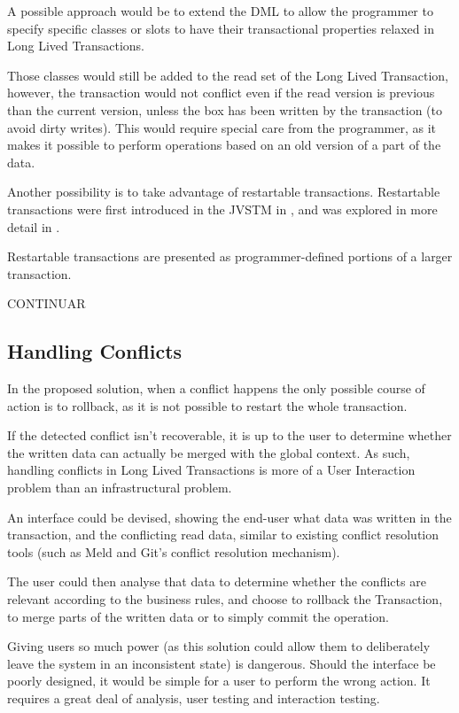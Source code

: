A possible approach would be to extend the DML to allow the programmer
to specify specific classes or slots to have their transactional
properties relaxed in Long Lived Transactions.

Those classes would still be added to the read set of the Long Lived
Transaction, however, the transaction would not conflict even if the
read version is previous than the current version, unless the box has
been written by the transaction (to avoid dirty writes). This would
require special care from the programmer, as it makes it possible to
perform operations based on an old version of a part of the data.

Another possibility is to take advantage of restartable
transactions. Restartable transactions were first introduced in the
JVSTM in \cite{cachopo2006versioned}, and was explored in more detail
in \cite{BrunoJorgeGasparFranco2013}.

Restartable transactions are presented as programmer-defined portions
of a larger transaction.

CONTINUAR

\subsection{Handling Conflicts}

In the proposed solution, when a conflict happens the only possible
course of action is to rollback, as it is not possible to restart the
whole transaction.

If the detected conflict isn't recoverable, it is up to the user to
determine whether the written data can actually be merged with the
global context. As such, handling conflicts in Long Lived Transactions
is more of a User Interaction problem than an infrastructural problem.

An interface could be devised, showing the end-user what data was
written in the transaction, and the conflicting read data, similar to
existing conflict resolution tools (such as Meld and Git's conflict
resolution mechanism).

The user could then analyse that data to determine whether the
conflicts are relevant according to the business rules, and choose to
rollback the Transaction, to merge parts of the written data or to
simply commit the operation.

Giving users so much power (as this solution could allow them to
deliberately leave the system in an inconsistent state) is
dangerous. Should the interface be poorly designed, it would be simple
for a user to perform the wrong action. It requires a great deal of
analysis, user testing and interaction testing.

